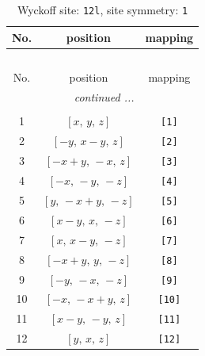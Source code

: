 \documentclass[fleqn,8pt]{jsarticle}
\begin{document}
\begin{longtable}{ccc}
\caption{Wyckoff site: {\tt 12l}, site symmetry: {\tt 1}}
 \\
 \hline \hline
No. & position & mapping \\ \hline \endfirsthead

\multicolumn{2}{l}{\tablename\ \thetable{}} \\
 \hline \hline
No. & position & mapping \\ \hline \endhead

 \hline \hline
\multicolumn{2}{r}{\footnotesize\it continued ...} \\ \endfoot

 \hline \hline
\multicolumn{2}{r}{} \\ \endlastfoot

1 & $\left[ x,\, y,\, z \right]$ & {\tt [1]} \\ \hline
2 & $\left[ - y,\, x - y,\, z \right]$ & {\tt [2]} \\ \hline
3 & $\left[ - x + y,\, - x,\, z \right]$ & {\tt [3]} \\ \hline
4 & $\left[ - x,\, - y,\, - z \right]$ & {\tt [4]} \\ \hline
5 & $\left[ y,\, - x + y,\, - z \right]$ & {\tt [5]} \\ \hline
6 & $\left[ x - y,\, x,\, - z \right]$ & {\tt [6]} \\ \hline
7 & $\left[ x,\, x - y,\, - z \right]$ & {\tt [7]} \\ \hline
8 & $\left[ - x + y,\, y,\, - z \right]$ & {\tt [8]} \\ \hline
9 & $\left[ - y,\, - x,\, - z \right]$ & {\tt [9]} \\ \hline
10 & $\left[ - x,\, - x + y,\, z \right]$ & {\tt [10]} \\ \hline
11 & $\left[ x - y,\, - y,\, z \right]$ & {\tt [11]} \\ \hline
12 & $\left[ y,\, x,\, z \right]$ & {\tt [12]} \\
\end{longtable}
\end{document}
